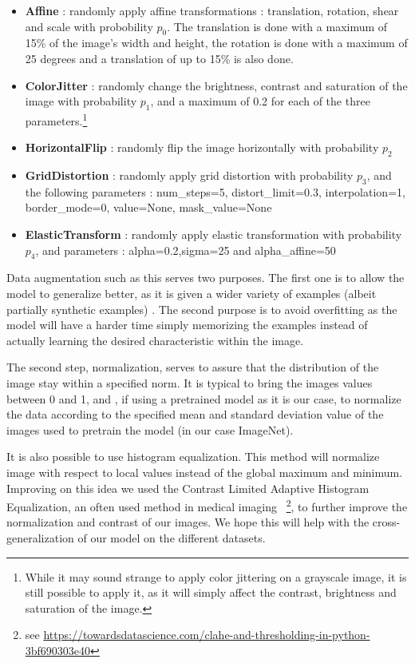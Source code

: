 \documentclass[11pt]{article}
\begin{document}
    \begin{itemize}
        \item \textbf{Affine} : randomly apply affine transformations : translation, rotation, shear and scale with
        probobility $p_0$. The translation is done with a maximum of 15\% of the image's width and height, the
        rotation is done with a maximum of 25 degrees and a translation of up to 15\% is also done.
        \item \textbf{ColorJitter} : randomly change the brightness, contrast and saturation of the image with
        probability $p_1$, and a maximum of 0.2 for each of the three parameters.\footnote{While it may sound strange
        to apply color jittering on a grayscale image, it is still possible to apply it, as it will simply affect the
        contrast, brightness and saturation of the image.}
        \item \textbf{HorizontalFlip} : randomly flip the image horizontally with probability $p_2$
        \item \textbf{GridDistortion} : randomly apply grid distortion with probability $p_3$, and the following
        parameters : num\_steps=5, distort\_limit=0.3, interpolation=1, border\_mode=0, value=None, mask\_value=None
        \item \textbf{ElasticTransform} : randomly apply elastic transformation with probability $p_4$, and
        parameters : alpha=0.2,sigma=25 and alpha\_affine=50
        \label{tab:augmentations}
    \end{itemize}

    Data augmentation such as this serves two purposes. The first one is to allow the model to generalize better, as it is given
    a wider variety of examples (albeit partially synthetic examples) . The second purpose is to avoid overfitting as the model will
    have a harder time simply memorizing the examples instead of actually learning the desired characteristic within the image.

    The second step, normalization, serves to assure that the distribution of the image stay within a specified norm. It is typical
    to bring the images values between 0 and 1, and , if using a pretrained model as it is our case, to normalize the data
    according to the specified mean and standard deviation value of the images used to pretrain the model (in our case ImageNet).

    It is also possible to use histogram equalization. This method will normalize image with respect to local values instead of the global maximum and minimum.
    Improving on this idea we used the Contrast Limited Adaptive Histogram Equalization, an often used method in
    medical imaging~\cite{clahe}
    \footnote{see \url{https://towardsdatascience.com/clahe-and-thresholding-in-python-3bf690303e40}},
    to further improve the normalization and contrast of our images. We hope this will help with the
    cross-generalization of our model on the different datasets.
\end{document}

